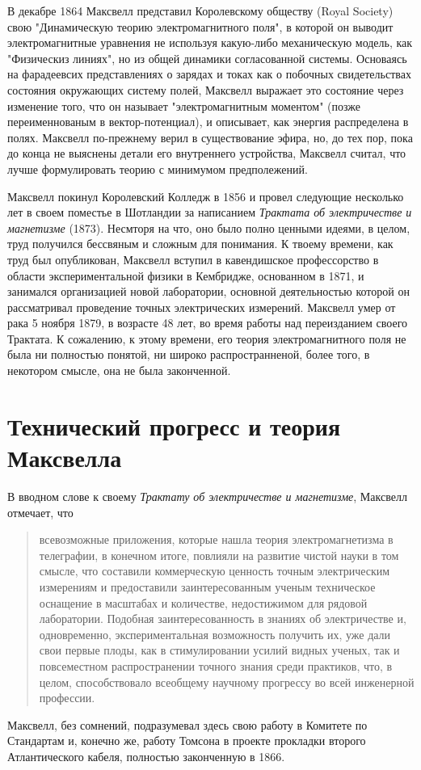 \documentclass[12pt, oneside, a4paper]{article}
\begin{document}
В декабре 1864 Максвелл представил Королевскому обществу (Royal Society) свою "Динамическую теорию электромагнитного поля", в которой он выводит электромагнитные уравнения не используя какую-либо механическую модель, как "Физическиз линиях", но из общей динамики согласованной системы. Основаясь на фарадеевсих представлениях о зарядах и токах как о побочных свидетельствах состояния окружающих систему полей, Максвелл выражает это состояние через изменение того, что он называет "электромагнитным моментом" (позже переименнованым в вектор-потенциал), и описывает, как энергия распределена в полях. Максвелл по-прежнему верил в существование эфира, но, до тех пор, пока до конца не выяснены детали его внутреннего устройства, Максвелл считал, что лучше формулировать теорию с минимумом предполежений. 

Максвелл покинул Королевский Колледж в 1856 и провел следующие несколько лет в своем поместье в Шотландии за написанием  \emph{Трактата об электричестве и магнетизме} (1873). Несмторя на что, оно было полно ценными идеями, в целом, труд получился бессвяным и сложным для понимания. К твоему времени, как труд был опубликован, Максвелл вступил в кавендишское профессорство в области экспериментальной физики в Кембридже, основанном в 1871, и занимался организацией новой лаборатории, основной деятельностью которой он рассматривал проведение точных электрических измерений. Максвелл умер от рака 5 ноября 1879, в возрасте 48 лет, во время работы над переизданием своего Трактата. К сожалению, к этому времени, его теория электромагнитного поля не была ни полностью понятой, ни широко распространненой, более того, в некотором смысле, она не была законченной.

\section*{Технический прогресс и теория Максвелла}
В вводном слове к своему \emph{Трактату об электричестве и магнетизме}, Максвелл отмечает, что 
\begin{quote}
\small
всевозможные приложения, которые нашла теория электромагнетизма в телеграфии, в конечном итоге, повлияли на развитие чистой науки в том смысле, что составили коммерческую ценность точным электрическим измерениям и предоставили заинтересованным ученым техническое оснащение в масштабах и количестве, недостижимом для рядовой лаборатории. Подобная заинтересованность в знаниях об электричестве и, одновременно, экспериментальная возможность получить их, уже дали свои первые плоды, как в стимулировании усилий видных ученых, так и повсеместном распространении точного знания среди практиков, что, в целом, способствовало  всеобщему научному прогрессу во всей инженерной профессии.
\end{quote}
Максвелл, без сомнений, подразумевал здесь свою работу в Комитете по Стандартам и, конечно же, работу Томсона в проекте прокладки второго Атлантического кабеля, полностью законченную в 1866.
\end{document}
